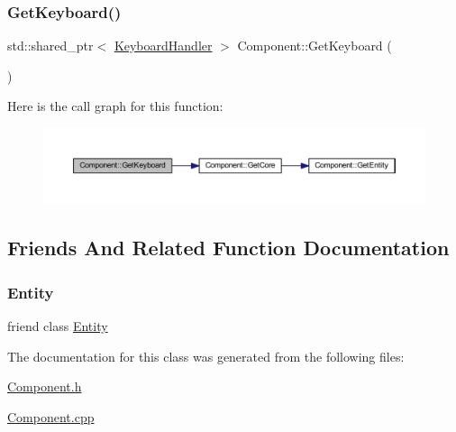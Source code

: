 \subsubsection{\texorpdfstring{Get\+Keyboard()}{GetKeyboard()}}
{\footnotesize\ttfamily std\+::shared\+\_\+ptr$<$ \mbox{\hyperlink{class_keyboard_handler}{Keyboard\+Handler}} $>$ Component\+::\+Get\+Keyboard (\begin{DoxyParamCaption}{ }\end{DoxyParamCaption})}

Here is the call graph for this function\+:
\nopagebreak
\begin{figure}[H]
\begin{center}
\leavevmode
\includegraphics[width=350pt]{class_component_a1639a645d23caae1be3b952b850a65c4_cgraph}
\end{center}
\end{figure}


\subsection{Friends And Related Function Documentation}
\mbox{\label{class_component_a614439ccac0344926adc4c0165d64060}} 
\subsubsection{\texorpdfstring{Entity}{Entity}}
{\footnotesize\ttfamily friend class \mbox{\hyperlink{class_entity}{Entity}}\hspace{0.3cm}{\ttfamily [friend]}}



The documentation for this class was generated from the following files\+:\begin{DoxyCompactItemize}
\item 
\mbox{\hyperlink{_component_8h}{Component.\+h}}\item 
\mbox{\hyperlink{_component_8cpp}{Component.\+cpp}}\end{DoxyCompactItemize}
